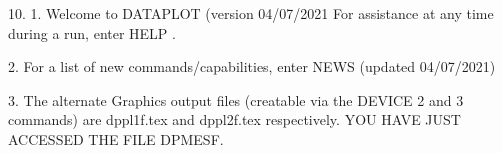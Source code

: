 10.
1. Welcome to DATAPLOT (version 04/07/2021  For assistance at
   any time during a run, enter HELP   .

2. For a list of new commands/capabilities,
   enter NEWS  (updated 04/07/2021)

3. The alternate Graphics output files (creatable
   via the DEVICE 2 and 3 commands) are
   dppl1f.tex and dppl2f.tex respectively.
YOU HAVE JUST ACCESSED THE FILE DPMESF.
